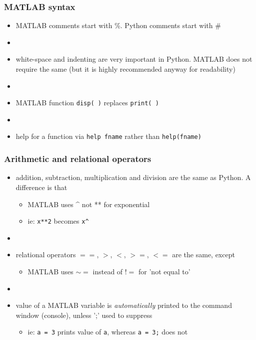 \documentclass[english,14pt]{beamer}
\begin{document}

\begin{frame}[fragile]

\frametitle{MATLAB syntax}

\begin{itemize}
	\item MATLAB comments start with \%. Python comments start with \#
	\item[]
	\item white-space and indenting are very important in Python. MATLAB does not require the same (but it is highly recommended anyway for readability) 
	\item[]
	\item MATLAB function \texttt{disp( )} replaces \texttt{print( )}
	\item[]
	\item help for a function via \texttt{help fname} rather than \texttt{help(fname)}
\end{itemize}
\end{frame}




\begin{frame}[fragile]

\frametitle{Arithmetic and relational operators}

\begin{itemize}

\item addition, subtraction, multiplication and division are the same as Python. A difference is that
	\begin{itemize}
		\item MATLAB uses \^ \;\; not ** for exponential
		\item ie: \texttt{x**2} becomes \texttt{x\^}
	\end{itemize}
	\item[]
\item relational operators $==$, $>$, $<$, $>=$, $<=$ are the same, except
	\begin{itemize}
		\item MATLAB uses $\sim =$  instead of $!=$ for 'not equal to'
	\end{itemize}
	\item[]
\item value of a MATLAB variable is \emph{automatically} printed to the command window (console), unless ';' used to suppress
\begin{itemize}
\item ie: \texttt{a = 3} prints value of \texttt{a}, whereas \texttt{a = 3;} does not
	\end{itemize}
\end{itemize}
\end{frame}
\end{document}
